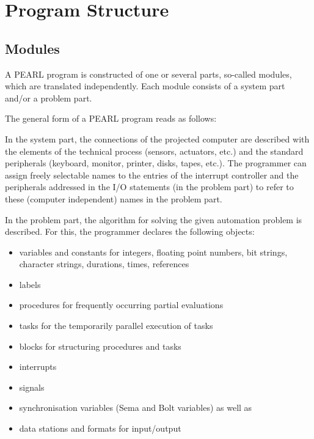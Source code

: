\chapter{Program Structure}   %

\section{Modules}  %
\label{sec_modules}

A PEARL program is constructed of one or several parts, so-called
modules, which are translated independently. Each module consists of a
system part and/or a problem part.

The general form of a PEARL program reads as follows:


\begin{grammarframe}







\end{grammarframe}

In the system part, the connections of the projected computer are
described with the elements of the technical process (sensors,
actuators, etc.) and the standard peripherals (keyboard, monitor,
printer, disks, tapes, etc.). The programmer can assign freely
selectable names to the entries of the interrupt controller and the
peripherals addressed in the I/O statements (in the problem part) to
refer to these (computer independent) names in the problem part.

In the problem part, the algorithm for solving the given automation
problem is described. For this, the programmer declares the following
objects:

\begin{itemize}
\item variables and constants for integers, floating point numbers, bit
strings, character strings, durations, times, references
\item labels
\item procedures for frequently occurring partial evaluations
\item tasks for the temporarily parallel execution of tasks
\item blocks for structuring procedures and tasks
\item interrupts
\item signals
\item synchronisation variables (Sema and Bolt variables) as well as
\item data stations and formats for input/output
\end{itemize}

